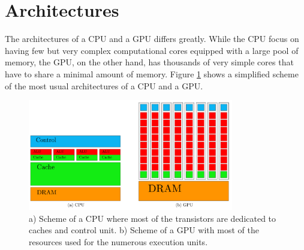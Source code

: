 \section{Architectures}\label{sec:gpu_arch}

The architectures of a CPU and a GPU differs greatly. While the CPU focus on having few but very complex computational cores equipped with a large pool of memory, the GPU, on the other hand, has thousands of very simple cores that have to share a minimal amount of memory. Figure \ref{archs} shows a simplified scheme of the most usual architectures of a CPU and a GPU.

\begin{figure}
\centerline{\includegraphics[width=0.8\textwidth]{architectures/archs.png}}
\caption{a) Scheme of a CPU where most of the transistors are dedicated to caches and control unit. b) Scheme of a GPU with most of the resources used for the numerous execution units.}
\label{archs}
\end{figure}

